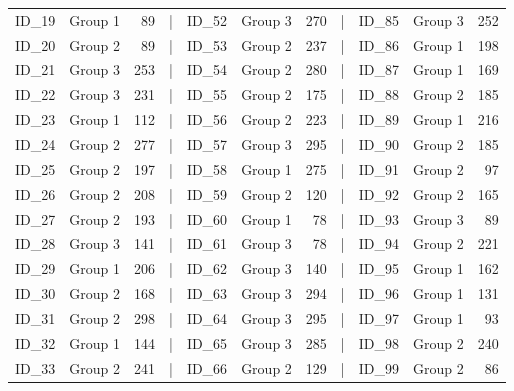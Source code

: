 \documentclass[smallextended]{svjour3}       %
\begin{document}
\begin{table}
\begin{tabular}[t]{llrlllrlllr}
ID\_19 & Group 1 & 89 & | & ID\_52 & Group 3 & 270 & | & ID\_85 & Group 3 & 252\\
ID\_20 & Group 2 & 89 & | & ID\_53 & Group 2 & 237 & | & ID\_86 & Group 1 & 198\\
\addlinespace
ID\_21 & Group 3 & 253 & | & ID\_54 & Group 2 & 280 & | & ID\_87 & Group 1 & 169\\
ID\_22 & Group 3 & 231 & | & ID\_55 & Group 2 & 175 & | & ID\_88 & Group 2 & 185\\
ID\_23 & Group 1 & 112 & | & ID\_56 & Group 2 & 223 & | & ID\_89 & Group 1 & 216\\
ID\_24 & Group 2 & 277 & | & ID\_57 & Group 3 & 295 & | & ID\_90 & Group 2 & 185\\
ID\_25 & Group 2 & 197 & | & ID\_58 & Group 1 & 275 & | & ID\_91 & Group 2 & 97\\
\addlinespace
ID\_26 & Group 2 & 208 & | & ID\_59 & Group 2 & 120 & | & ID\_92 & Group 2 & 165\\
ID\_27 & Group 2 & 193 & | & ID\_60 & Group 1 & 78 & | & ID\_93 & Group 3 & 89\\
ID\_28 & Group 3 & 141 & | & ID\_61 & Group 3 & 78 & | & ID\_94 & Group 2 & 221\\
ID\_29 & Group 1 & 206 & | & ID\_62 & Group 3 & 140 & | & ID\_95 & Group 1 & 162\\
ID\_30 & Group 2 & 168 & | & ID\_63 & Group 3 & 294 & | & ID\_96 & Group 1 & 131\\
\addlinespace
ID\_31 & Group 2 & 298 & | & ID\_64 & Group 3 & 295 & | & ID\_97 & Group 1 & 93\\
ID\_32 & Group 1 & 144 & | & ID\_65 & Group 3 & 285 & | & ID\_98 & Group 2 & 240\\
ID\_33 & Group 2 & 241 & | & ID\_66 & Group 2 & 129 & | & ID\_99 & Group 2 & 86\\
\bottomrule
\end{tabular}
\end{table}

\newpage
\end{document}
